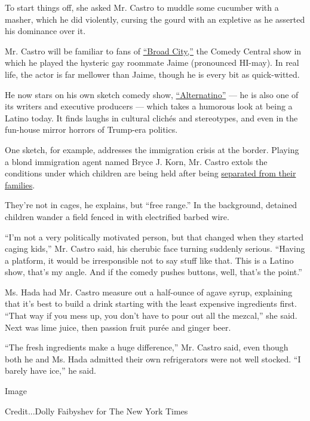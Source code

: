 To start things off, she asked Mr. Castro to muddle some cucumber with a
masher, which he did violently, cursing the gourd with an expletive as
he asserted his dominance over it.

Mr. Castro will be familiar to fans of
\href{https://www.nytimes.com/2014/01/22/arts/television/broad-city-brings-a-female-twist-to-failure.html}{``Broad
City,''} the Comedy Central show in which he played the hysteric gay
roommate Jaime (pronounced HI-may). In real life, the actor is far
mellower than Jaime, though he is every bit as quick-witted.

He now stars on his own sketch comedy show,
\href{http://www.cc.com/shows/alternatino}{``Alternatino''} --- he is
also one of its writers and executive producers --- which takes a
humorous look at being a Latino today. It finds laughs in cultural
clichés and stereotypes, and even in the fun-house mirror horrors of
Trump-era politics.

One sketch, for example, addresses the immigration crisis at the border.
Playing a blond immigration agent named Bryce J. Korn, Mr. Castro extols
the conditions under which children are being held after being
\href{https://www.nytimes.com/2018/09/12/us/migrant-children-detention.html}{separated
from their families}.

They're not in cages, he explains, but ``free range.'' In the
background, detained children wander a field fenced in with electrified
barbed wire.

``I'm not a very politically motivated person, but that changed when
they started caging kids,'' Mr. Castro said, his cherubic face turning
suddenly serious. ``Having a platform, it would be irresponsible not to
say stuff like that. This is a Latino show, that's my angle. And if the
comedy pushes buttons, well, that's the point.''

Ms. Hada had Mr. Castro measure out a half-ounce of agave syrup,
explaining that it's best to build a drink starting with the least
expensive ingredients first. ``That way if you mess up, you don't have
to pour out all the mezcal,'' she said. Next was lime juice, then
passion fruit purée and ginger beer.

``The fresh ingredients make a huge difference,'' Mr. Castro said, even
though both he and Ms. Hada admitted their own refrigerators were not
well stocked. ``I barely have ice,'' he said.

Image

Credit...Dolly Faibyshev for The New York Times

